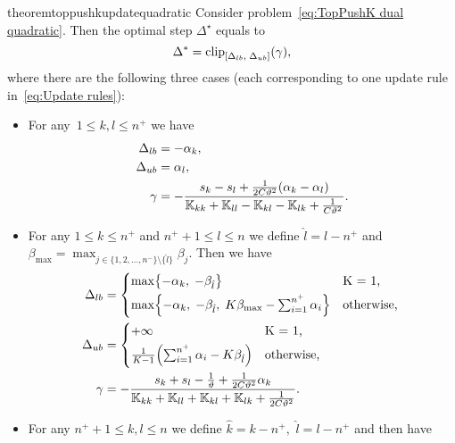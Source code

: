 \begin{restatable}{theorem}{toppushkupdatequadratic}\label{thm:Update rule TopPushK with quadratic loss}
  Consider problem~\eqref{eq:TopPushK dual quadratic}. Then the optimal step $\Delta^\star$ equals to
  \begin{equation}\label{eq:Optimal delta}
    \Delta^{*} = \clip{\Delta_{lb}}{\Delta_{ub}}{\gamma},
  \end{equation}
  where there are the following three cases (each corresponding to one update rule in~\eqref{eq:Update rules}):
  \begin{itemize}
    \item For any~$1\le k, l \le n^+$ we have
    \begin{align*}
      \Delta_{lb} & = -\alpha_k, \\
      \Delta_{ub} & = \alpha_l, \\
      \gamma      & = -\frac{s_k - s_l + \frac{1}{2C\vartheta^2}(\alpha_k - \alpha_l)}{\mathbb{K}_{kk} + \mathbb{K}_{ll} - \mathbb{K}_{kl} - \mathbb{K}_{lk} + \frac{1}{C\vartheta^2}}.
    \end{align*}
    \item For any $1 \le k \le n^+$ and $n^+ + 1 \le l \le n$ we define $\hat{l} = l - n^+$  and $\beta_{\max} = \max_{j \in \{1, 2, \ldots, n^- \} \setminus \{\hat l\}} \beta_j.$ Then we have
    \begin{align*}
      \Delta_{lb} & = 
        \begin{cases*}
          \max \Brac[c]{- \alpha_k,\;  -\beta_{\hat l}} & K = 1, \\
          \max \Brac[c]{- \alpha_k,\;  -\beta_{\hat l}, \; K\beta_{\max} - \sum_{i = 1}^{n^+} \alpha_i} & \textrm{otherwise},
        \end{cases*} \\
      \Delta_{ub} & = 
        \begin{cases*}
          + \infty & K = 1, \\
          \frac{1}{K-1}\Brac{\sum_{i = 1}^{n^+} \alpha_i - K \beta_{\hat l}} & \textrm{otherwise},
        \end{cases*} \\
      \gamma & = -\frac{s_k + s_l - \frac{1}{\vartheta} + \frac{1}{2C\vartheta^2} \alpha_k}{\K_{kk} + \K_{ll} + \K_{kl} + \K_{lk} + \frac{1}{2C\vartheta^2}}.
    \end{align*}
    \item For any $n^+ + 1\le k,l \le n$ we define $\hat{k} = k - n^+,$ $\hat{l} = l - n^+$ and then  have

\end{itemize}
\end{restatable}
